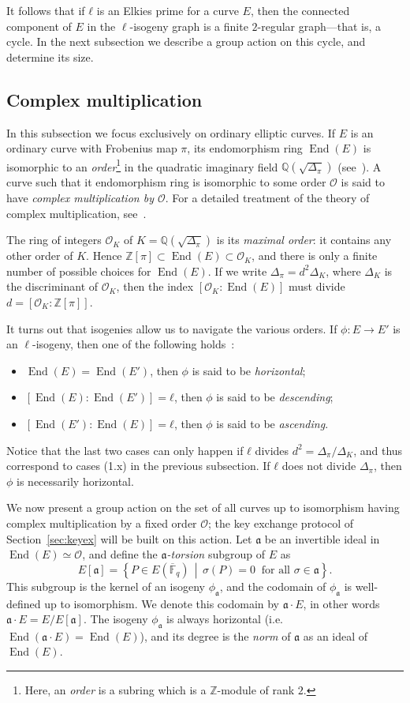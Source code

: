\documentclass{llncs}
\newcommand{\Fbar}{\overline{\mathbb{F}}}
\renewcommand{\O}{\mathcal{O}}
\newcommand{\set}[1]{\left\{#1\right\}}
\newcommand{\suchthat}{\,\middle\vert\,}
\renewcommand{\frak}{\mathfrak}
\DeclareMathOperator{\End}{End}
\begin{document}
It follows that if $ℓ$ is an Elkies prime for a curve $E$,
then the connected component of $E$ in the $\ell$-isogeny graph 
is a finite $2$-regular graph---that is, a cycle. 
In the next subsection we describe a group action on this cycle,
and determine its size.


\subsection{Complex multiplication}

In this subsection we focus exclusively on ordinary elliptic
curves. If $E$ is an ordinary curve with Frobenius map $π$, its
endomorphism ring $\End(E)$ is isomorphic to an
\emph{order}\footnote{Here, an \emph{order} is a subring which is a
  $ℤ$-module of rank $2$.} in the quadratic imaginary field
$ℚ(\sqrt{Δ_π})$ (see~\cite[III.9]{silverman:elliptic}).  A curve such
that it endomorphism ring is isomorphic to some order $\O$ is said to
have \emph{complex multiplication by $\O$}.  For a detailed treatment
of the theory of complex multiplication,
see~\cite{lang1987elliptic,silverman:advanced}.

The ring of integers $\O_K$ of $K=ℚ(\sqrt{Δ_π})$ is its
\emph{maximal order}: it contains any other order of $K$.  Hence
$ℤ[π]⊂\End(E)⊂\O_K$, and there is only a finite number of possible
choices for $\End(E)$. If we write $Δ_π=d^2Δ_K$, where $Δ_K$ is the
discriminant of $\O_K$, then the index $[\O_K:\End(E)]$ must divide
$d=[\O_K:ℤ[π]]$.

It turns out that isogenies allow us to navigate the various
orders. If $ϕ:E→E'$ is an $\ell$-isogeny, then one of the following
holds~\cite[Prop.~21]{kohel}:
\begin{itemize}
\item $\End(E) = \End(E')$, then $ϕ$ is said to be
  \emph{horizontal};
\item $[\End(E):\End(E')] = ℓ$, then $ϕ$ is said to be
  \emph{descending};
\item $[\End(E'):\End(E)] = ℓ$, then $ϕ$ is said to be
  \emph{ascending}.
\end{itemize}
Notice that the last two cases can only happen if $ℓ$ divides
$d^2=Δ_π/Δ_K$, and thus correspond to cases (1.x) in the previous
subsection.
If $ℓ$ does not divide $Δ_π$, then $ϕ$ is necessarily horizontal.

We now present a group action on the set of all curves 
up to isomorphism having complex
multiplication by a fixed order $\O$; the key exchange protocol of
Section~\ref{sec:keyex} will be built on this action. Let $\frak a$ be
an invertible ideal in $\End(E)≃\O$, and define the
\emph{${\frak a}$-torsion} subgroup of $E$ as
\[
E[\frak a] = \set{P\in E(\Fbar_q) \suchthat σ(P) = 0\ 
\text{ for all }σ\in\frak a}.
\]
This subgroup is the kernel of an isogeny $\phi_{\frak a}$, and the codomain of
$\phi_{\frak a}$ is well-defined up to isomorphism.  We denote this
codomain by $\frak a\cdot E$, in other words
$\frak a\cdot E = E/E[\frak a]$.  The isogeny $\phi_{\frak a}$ is
always horizontal (i.e.\ $\End(\frak a \cdot E) = \End(E)$), and its
degree is the \emph{norm} of $\frak a$ as an ideal of $\End(E)$.
\end{document}
